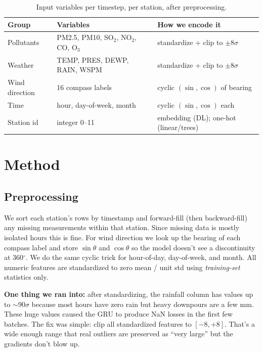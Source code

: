 \documentclass{article}
\begin{document}
\begin{table}[t]
\centering
\small
\caption{Input variables per timestep, per station, after preprocessing.}
\label{tab:variables}
\begin{tabular}{lll}
\toprule
\textbf{Group} & \textbf{Variables} & \textbf{How we encode it} \\
\midrule
Pollutants     & PM2.5, PM10, SO$_2$, NO$_2$, CO, O$_3$ & standardize + clip to $\pm 8\sigma$ \\
Weather        & TEMP, PRES, DEWP, RAIN, WSPM           & standardize + clip to $\pm 8\sigma$ \\
Wind direction & 16 compass labels                      & cyclic $(\sin, \cos)$ of bearing \\
Time           & hour, day-of-week, month               & cyclic $(\sin, \cos)$ each \\
Station id     & integer 0--11                          & embedding (DL); one-hot (linear/trees) \\
\bottomrule
\end{tabular}
\end{table}

\section{Method}
\label{sec:method}

\subsection{Preprocessing}

We sort each station's rows by timestamp and forward-fill (then
backward-fill) any missing measurements within that station. Since
missing data is mostly isolated hours this is fine. For wind direction
we look up the bearing of each compass label and store $\sin\theta$ and
$\cos\theta$ so the model doesn't see a discontinuity at 360$^\circ$.
We do the same cyclic trick for hour-of-day, day-of-week, and month.
All numeric features are standardized to zero mean / unit std using
\emph{training-set} statistics only.

\textbf{One thing we ran into:} after standardizing, the rainfall column
has values up to $\sim$90$\sigma$ because most hours have zero rain but
heavy downpours are a few mm. These huge values caused the GRU to
produce NaN losses in the first few batches. The fix was simple: clip
all standardized features to $[-8, +8]$. That's a wide enough range
that real outliers are preserved as ``very large'' but the gradients
don't blow up.
\end{document}
